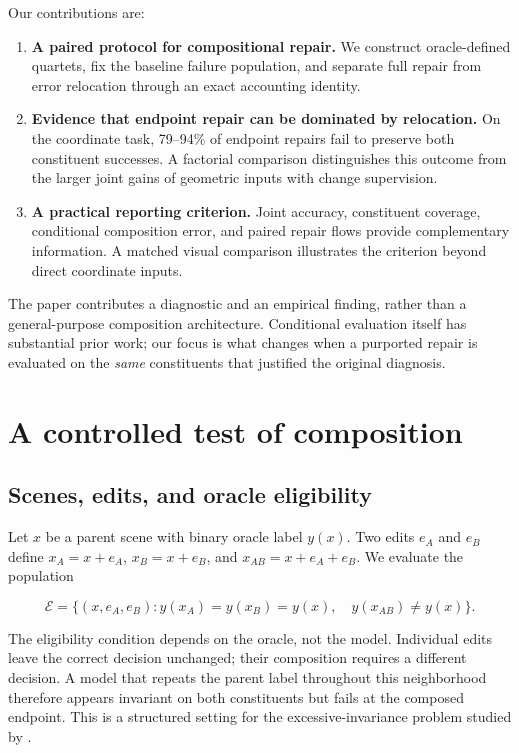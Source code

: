 Our contributions are:

\begin{enumerate}
\def\labelenumi{\arabic{enumi}.}
\tightlist
\item
  \textbf{A paired protocol for compositional repair.} We construct oracle-defined quartets, fix the baseline failure population, and separate full repair from error relocation through an exact accounting identity.
\item
  \textbf{Evidence that endpoint repair can be dominated by relocation.} On the coordinate task, 79--94\% of endpoint repairs fail to preserve both constituent successes. A factorial comparison distinguishes this outcome from the larger joint gains of geometric inputs with change supervision.
\item
  \textbf{A practical reporting criterion.} Joint accuracy, constituent coverage, conditional composition error, and paired repair flows provide complementary information. A matched visual comparison illustrates the criterion beyond direct coordinate inputs.
\end{enumerate}

The paper contributes a diagnostic and an empirical finding, rather than a general-purpose composition architecture. Conditional evaluation itself has substantial prior work; our focus is what changes when a purported repair is evaluated on the \emph{same} constituents that justified the original diagnosis.

\hypertarget{a-controlled-test-of-composition}{%
\section{A controlled test of composition}\label{a-controlled-test-of-composition}}

\hypertarget{scenes-edits-and-oracle-eligibility}{%
\subsection{Scenes, edits, and oracle eligibility}\label{scenes-edits-and-oracle-eligibility}}

Let \(x\) be a parent scene with binary oracle label \(y(x)\). Two edits \(e_A\) and \(e_B\) define \(x_A=x+e_A\), \(x_B=x+e_B\), and \(x_{AB}=x+e_A+e_B\). We evaluate the population

\[
\mathcal E=\{(x,e_A,e_B):y(x_A)=y(x_B)=y(x),\quad y(x_{AB})\ne y(x)\}.
\]

The eligibility condition depends on the oracle, not the model. Individual edits leave the correct decision unchanged; their composition requires a different decision. A model that repeats the parent label throughout this neighborhood therefore appears invariant on both constituents but fails at the composed endpoint. This is a structured setting for the excessive-invariance problem studied by \citet{jacobsen2019excessive}.

